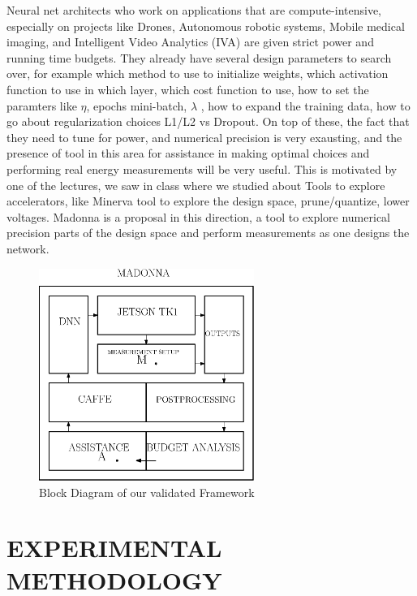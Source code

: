 \documentclass[letterpaper, 10 pt, conference]{ieeeconf}
\begin{document}
Neural net architects who work on applications that are compute-intensive, especially on projects like Drones, Autonomous robotic systems, Mobile medical imaging, and Intelligent Video Analytics (IVA) are given strict power and running time budgets. They already have several design parameters to search over, for example which method to use to initialize weights, which activation function to use in which layer, which cost function to use, how to set the paramters like $\eta$, epochs mini-batch, $\lambda$ , how to expand the training data, how to go about regularization choices L1/L2 vs Dropout. 
On top of these, the fact that they need to tune for power, and numerical precision is very exausting, and the presence of tool in this area for assistance in making optimal choices and performing real energy measurements will be very useful. This is motivated by one of the lectures, we saw in class where we studied about Tools to explore accelerators, like Minerva tool to explore the design space, prune/quantize, lower voltages.
Madonna is a proposal in this direction, a tool to explore numerical precision parts of the design space and perform measurements as one designs the network.

\begin{figure}[h]
  \centering
  \includegraphics[width=70mm,scale=1]{frame}
  \caption{Block Diagram of our validated Framework}
  \label{fig:frame}
\end{figure}




\section{EXPERIMENTAL METHODOLOGY}
\end{document}

